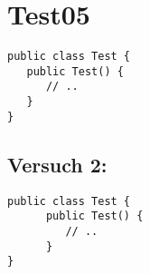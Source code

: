 \chapter{Test05}

\begin{lstlisting}
public class Test {
   public Test() {
      // ..
   }
}
\end{lstlisting}

\section{Versuch 2:}

\begin{lstlisting}
public class Test {
      public Test() {
         // ..
      }
}
\end{lstlisting}

\endinput
